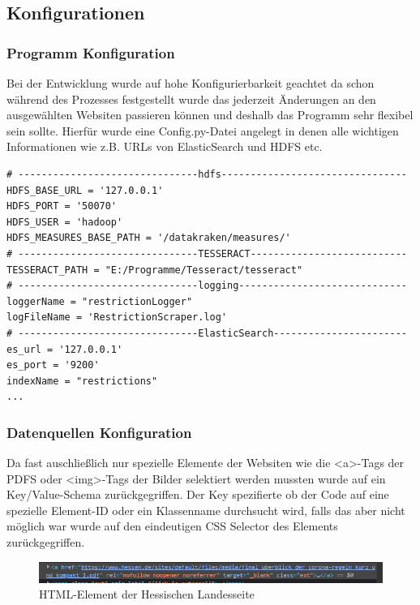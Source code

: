 \documentclass[12pt,oneside,a4paper,parskip]{scrbook}
\begin{document}
\subsection{Konfigurationen}

\subsubsection{Programm Konfiguration}
Bei der Entwicklung wurde auf hohe Konfigurierbarkeit geachtet da schon während des Prozesses festgestellt wurde das jederzeit Änderungen an den ausgewählten Websiten passieren können und deshalb das Programm sehr flexibel sein sollte. Hierfür wurde eine Config.py-Datei angelegt in denen alle wichtigen Informationen wie z.B. URLs von ElasticSearch und HDFS etc.

\begin{lstlisting}[caption=Config für das Programm]
# -------------------------------hdfs--------------------------------
HDFS_BASE_URL = '127.0.0.1'
HDFS_PORT = '50070'
HDFS_USER = 'hadoop'
HDFS_MEASURES_BASE_PATH = '/datakraken/measures/'
# -------------------------------TESSERACT---------------------------
TESSERACT_PATH = "E:/Programme/Tesseract/tesseract"
# -------------------------------logging-----------------------------
loggerName = "restrictionLogger"
logFileName = 'RestrictionScraper.log'
# -------------------------------ElasticSearch-----------------------
es_url = '127.0.0.1'
es_port = '9200'
indexName = "restrictions"
...
\end{lstlisting}

\pagebreak

\subsubsection{Datenquellen Konfiguration}
Da fast auschließlich nur spezielle Elemente der Websiten wie die \textless a\textgreater -Tags der PDFS oder  \textless img\textgreater -Tags der Bilder selektiert werden mussten wurde auf ein Key/Value-Schema zurückgegriffen. Der Key spezifierte ob der Code auf eine spezielle Element-ID oder ein Klassenname durchsucht wird, falls das aber nicht möglich war wurde auf den eindeutigen CSS Selector des Elements zurückgegriffen.

\begin{figure}[H]
\caption{HTML-Element der Hessischen Landesseite}
\label{htmlHessen}
\centering
\includegraphics[scale=1.0]{pictures/hessenHTMLexample.png}
\end{figure}
\end{document}
